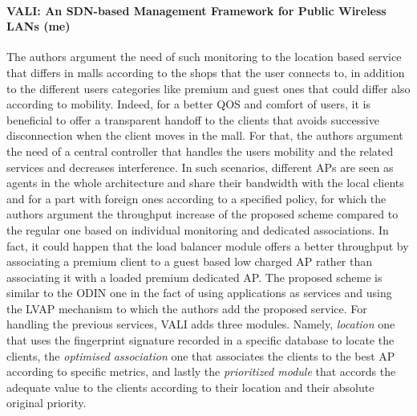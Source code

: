 \documentclass[journal,transmag]{IEEEtran}
\begin{document}
\paragraph{VALI: An SDN-based Management Framework for Public Wireless LANs \cite{16VALI_SDN} (me)}
The authors argument the need of such monitoring to the location based service that differs in malls according to the shops that the user connects to, in addition to the different users categories like premium and guest ones that could differ also according to mobility. Indeed, for a better QOS and comfort of users, it is beneficial to offer a transparent handoff to the clients that avoids successive disconnection when the client moves in the mall. For that, the authors argument the need of a central controller that handles the users mobility and the related services and decreases interference. In such scenarios, different APs are seen as agents in the whole architecture and share their bandwidth with the local clients and for a part with foreign ones according to a specified policy, for which the authors argument the throughput increase of the proposed scheme compared to the regular one based on individual monitoring and dedicated associations. In fact, it could happen that the load balancer module offers a better throughput by associating a premium client to a guest based low charged AP rather than associating it with a loaded premium dedicated AP. The proposed scheme is similar to the ODIN \cite{14Odin:Programmatic_Orchestration_WiFi} one in the fact of using applications as services and using the LVAP mechanism to which the authors add the proposed service. For handling the previous services, VALI adds three modules. Namely, \textit{location} one that uses the fingerprint signature recorded in a specific database to locate the clients, the \textit{optimised association} one that associates the clients to the best AP according to specific metrics, and lastly the \textit{prioritized module} that accords the adequate value to the clients according to their location and their absolute original priority.   \\
\end{document}
